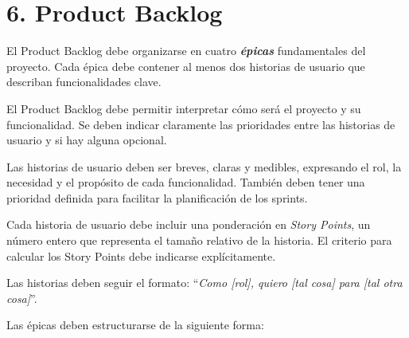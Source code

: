 \documentclass[
11pt, %
]{charter}
\begin{document}
\section{6. Product Backlog}
\label{sec:backlog}

El Product Backlog debe organizarse en cuatro \textbf{\textit{\'{e}picas}} fundamentales del proyecto. Cada \'{e}pica debe contener al menos dos historias de usuario que describan funcionalidades clave.

El Product Backlog debe permitir interpretar cómo será el proyecto y su funcionalidad. Se deben indicar claramente las prioridades entre las historias de usuario y si hay alguna opcional.

Las historias de usuario deben ser breves, claras y medibles, expresando el rol, la necesidad y el propósito de cada funcionalidad. También deben tener una prioridad definida para facilitar la planificación de los sprints.

Cada historia de usuario debe incluir una ponderación en \textit{Story Points}, un número entero que representa el tama\~no relativo de la historia. El criterio para calcular los Story Points debe indicarse explícitamente.

Las historias deben seguir el formato: ``\textit{Como [rol], quiero [tal cosa] para [tal otra cosa]}''.

Las \'{e}picas deben estructurarse de la siguiente forma:
\end{document}
